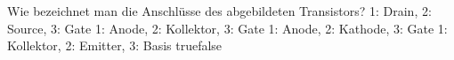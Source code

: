     {Wie bezeichnet man die Anschlüsse des abgebildeten Transistors?}
    {1: Drain, 2: Source, 3: Gate}
    {1: Anode, 2: Kollektor, 3: Gate}
    {1: Anode, 2: Kathode, 3: Gate}
    {1: Kollektor, 2: Emitter, 3: Basis}
    {true}{false}